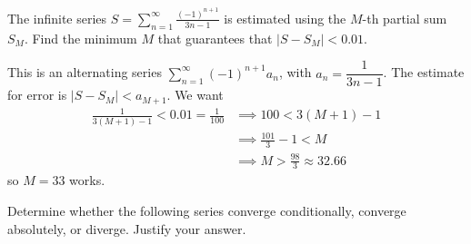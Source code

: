 \documentclass[12pt,answers]{exam}
\begin{document}
\begin{questions}
\question[6]
The infinite series $\displaystyle S = \sum_{n=1}^\infty \frac{(-1)^{n+1}}{3n-1}$ is estimated using the $M$-th partial sum $S_M$. Find the minimum $M$ that guarantees that $|S - S_M| < 0.01$.
\begin{solution}
    This is an alternating series $\displaystyle \sum_{n=1}^\infty (-1)^{n+1} a_n$, with $a_n = \dfrac{1}{3n-1}$.
    The estimate for error is 
    $|S - S_M| < a_{M+1}$. We want
    \begin{align*}
        \frac{1}{3(M+1)-1} < 0.01 = \frac{1}{100}
        &\implies 100 < 3(M+1) - 1 \\  
        &\implies \frac{101}{3} - 1 < M \\ 
        &\implies M > \frac{98}{3} \approx 32.66
    \end{align*}
    so $\boxed{M = 33}$ works.
\end{solution}

\question
Determine whether the following series converge conditionally, converge absolutely, or diverge. Justify your answer.
\end{questions}
\end{document}
